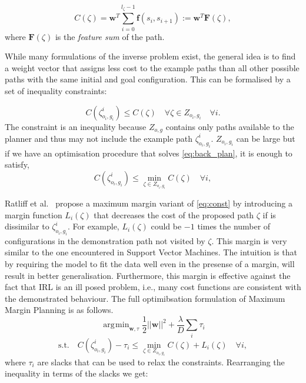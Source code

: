\documentclass{article}  %
\DeclareMathOperator*{\argmin}{\arg\!\min}
\begin{document}
\begin{equation}
	C(\zeta) = \mathbf{w}^T\sum_{i=0}^{l_{\zeta}-1} \mathbf{f}(s_i,s_{i+1}) := \mathbf{w}^T \mathbf{F}(\zeta),
\end{equation}
where $\mathbf{F}(\zeta)$ is the \emph{feature sum} of the path.

While many formulations of the inverse problem exist, the general idea is to find a weight vector that assigns less cost to the example paths than all other possible paths with the same initial and goal configuration.  This can be formalised by a set of inequality constraints:

\begin{equation}
	C(\zeta^i_{o_i,g_i}) \leq  C(\zeta) \quad \forall \zeta \in Z_{o_i,g_i}  \quad \forall i. \label{eq:const1}
\end{equation}
The constraint is an inequality because $Z_{o,g}$ contains only paths available to the planner and thus may not include the example path $\zeta^i_{o_i,g_i}$.
$Z_{o_i,g_i}$ can be large but if we have an optimisation procedure that solves \eqref{eq:back_plan}, it is enough to satisfy, 
\begin{equation}
	C(\zeta^i_{o_i,g_i}) \leq \min_{\zeta \in Z_{o_i,g_i}} C(\zeta) \quad \forall i, \label{eq:const}
\end{equation}

Ratliff et al.\ \cite{ratliff2006maximum} propose a maximum margin variant of \eqref{eq:const} by introducing a margin function $L_i(\zeta)$ that decreases the cost of the proposed path $\zeta$ if is dissimilar to $\zeta^i_{o_i,g_i}$. For example, $L_i(\zeta)$ could be $-1$ times the number of configurations in the demonstration path not visited by $\zeta$. This margin is very similar to the one encountered in Support Vector Machines. The intuition is that by requiring the model to fit the data well even in the presense of a margin, will result in better generalisation. Furthermore, this margin is effective against the fact that IRL is an ill posed problem, i.e., many cost functions are consistent with the demonstrated behaviour. The full optimibsation formulation of Maximum Margin Planning is as follows.
\begin{equation}
	\argmin_{\mathbf{w},\tau} \frac{1}{2}||\mathbf{w}||^2 + \frac{\lambda}{D} \sum_i \tau_i \label{eq:mas_marg}
\end{equation}
\begin{equation}
	\text{s.t.} \quad C(\zeta^i_{o_i,g_i}) - \tau_i \leq \min_{\zeta \in Z_{o_i,g_i}} C(\zeta) + L_i(\zeta) \quad \forall i,
\end{equation}
where $\tau_i$ are slacks that can be used to relax the constraints. Rearranging the inequality in terms of the slacks we get:
\end{document}
